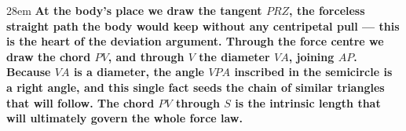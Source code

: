 \documentclass[border=4pt]{standalone}
\begin{document}
\begin{varwidth}{28em}
\large\bfseries
At the body's place we draw the tangent $PRZ$, the forceless straight path the body would keep      without any centripetal pull — this is the heart of the deviation argument.      Through the force centre we draw the chord $PV$, and through $V$ the diameter $VA$, joining $AP$.      Because $VA$ is a diameter, the angle $VPA$ inscribed in the semicircle is a right angle,      and this single fact seeds the chain of similar triangles that will follow.      The chord $PV$ through $S$ is the intrinsic length that will ultimately govern the whole force law.
\end{varwidth}
\end{document}
